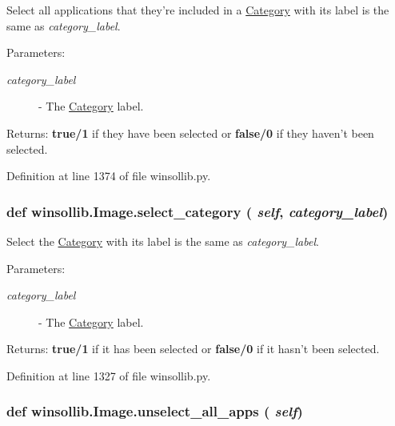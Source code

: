 Select all applications that they're included in a \hyperlink{classwinsollib_1_1Category}{Category} with its label is the same as {\em category\_\-label\/}. 

\begin{Desc}
\item[Parameters:]
\begin{description}
\item[{\em category\_\-label}]- The \hyperlink{classwinsollib_1_1Category}{Category} label. \end{description}
\end{Desc}
\begin{Desc}
\item[Returns:]{\bf true/1} if they have been selected or {\bf false/0} if they haven't been selected. \end{Desc}


Definition at line 1374 of file winsollib.py.\hypertarget{classwinsollib_1_1Image_72257b871ac2df33ebf57cc2ccdc104e}{
\subsubsection[select\_\-category]{\setlength{\rightskip}{0pt plus 5cm}def winsollib.Image.select\_\-category ( {\em self},  {\em category\_\-label})}}
\label{classwinsollib_1_1Image_72257b871ac2df33ebf57cc2ccdc104e}


Select the \hyperlink{classwinsollib_1_1Category}{Category} with its label is the same as {\em category\_\-label\/}. 

\begin{Desc}
\item[Parameters:]
\begin{description}
\item[{\em category\_\-label}]- The \hyperlink{classwinsollib_1_1Category}{Category} label. \end{description}
\end{Desc}
\begin{Desc}
\item[Returns:]{\bf true/1} if it has been selected or {\bf false/0} if it hasn't been selected. \end{Desc}


Definition at line 1327 of file winsollib.py.\hypertarget{classwinsollib_1_1Image_07601dc9093b73baf5cef5746e7a6deb}{
\subsubsection[unselect\_\-all\_\-apps]{\setlength{\rightskip}{0pt plus 5cm}def winsollib.Image.unselect\_\-all\_\-apps ( {\em self})}}
\label{classwinsollib_1_1Image_07601dc9093b73baf5cef5746e7a6deb}


